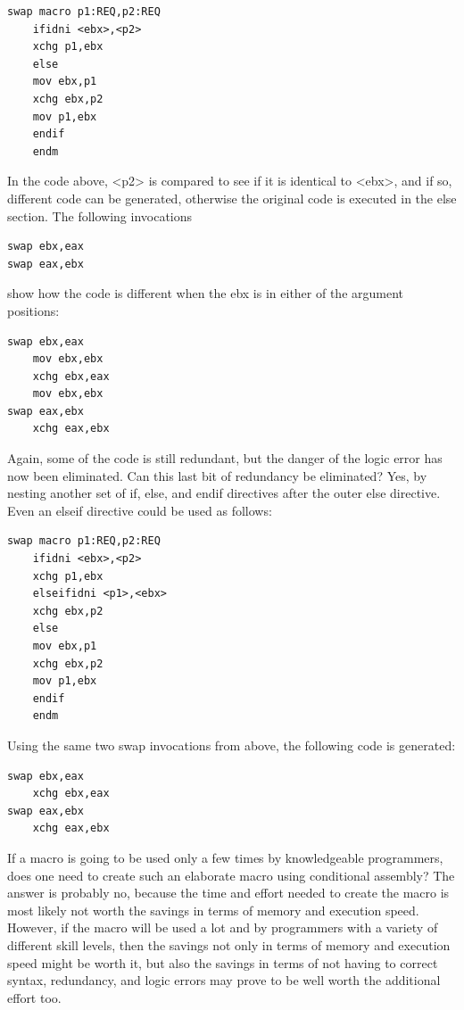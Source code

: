 \documentclass[10pt]{book}
\begin{document}
\begin{verbatim}
swap macro p1:REQ,p2:REQ
    ifidni <ebx>,<p2>
    xchg p1,ebx
    else
    mov ebx,p1
    xchg ebx,p2
    mov p1,ebx
    endif
    endm
\end{verbatim}

In the code above, <p2> is compared to see if it is identical to <ebx>, and if so, different code can be generated, otherwise the original code is executed in the else section. The following invocations

\begin{verbatim}
swap ebx,eax
swap eax,ebx
\end{verbatim}

show how the code is different when the ebx is in either of the argument positions:

\begin{verbatim}
swap ebx,eax
    mov ebx,ebx
    xchg ebx,eax
    mov ebx,ebx
swap eax,ebx
    xchg eax,ebx
\end{verbatim}

Again, some of the code is still redundant, but the danger of the logic error has now been eliminated. Can this last bit of redundancy be eliminated? Yes, by nesting another set of if, else, and endif directives after the outer else directive. Even an elseif directive could be used as follows:

\begin{verbatim}
swap macro p1:REQ,p2:REQ
    ifidni <ebx>,<p2>
    xchg p1,ebx
    elseifidni <p1>,<ebx>
    xchg ebx,p2
    else
    mov ebx,p1
    xchg ebx,p2
    mov p1,ebx
    endif
    endm
\end{verbatim}

Using the same two swap invocations from above, the following code is generated:

\begin{verbatim}
swap ebx,eax
    xchg ebx,eax
swap eax,ebx
    xchg eax,ebx
\end{verbatim}

If a macro is going to be used only a few times by knowledgeable programmers, does one need to create such an elaborate macro using conditional assembly? The answer is probably no, because the time and effort needed to create the macro is most likely not worth the savings in terms of memory and execution speed. However, if the macro will be used a lot and by programmers with a variety of different skill levels, then the savings not only in terms of memory and execution speed might be worth it, but also the savings in terms of not having to correct syntax, redundancy, and logic errors may prove to be well worth the additional effort too.
\end{document}
